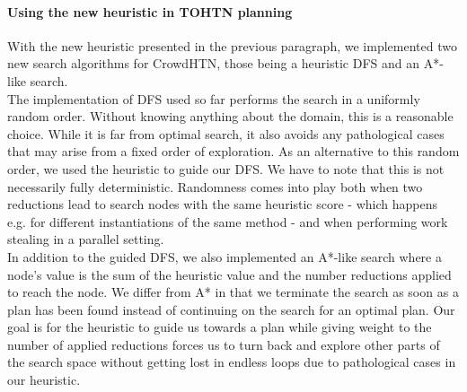 \paragraph{Using the new heuristic in TOHTN planning}
With the new heuristic presented in the previous paragraph, we implemented two new search algorithms for CrowdHTN, those being a heuristic DFS and an A*-like search. \\
The implementation of DFS used so far performs the search in a uniformly random order. Without knowing anything about the domain, this is a reasonable choice. While it is far from optimal search, it also avoids any pathological cases that may arise from a fixed order of exploration. As an alternative to this random order, we used the heuristic to guide our DFS. We have to note that this is not necessarily fully deterministic. Randomness comes into play both when two reductions lead to search nodes with the same heuristic score - which happens e.g. for different instantiations of the same method - and when performing work stealing in a parallel setting. \\
In addition to the guided DFS, we also implemented an A*-like search where a node's value is the sum of the heuristic value and the number reductions applied to reach the node. We differ from A* in that we terminate the search as soon as a plan has been found instead of continuing on the search for an optimal plan. Our goal is for the heuristic to guide us towards a plan while giving weight to the number of applied reductions forces us to turn back and explore other parts of the search space without getting lost in endless loops due to pathological cases in our heuristic.

